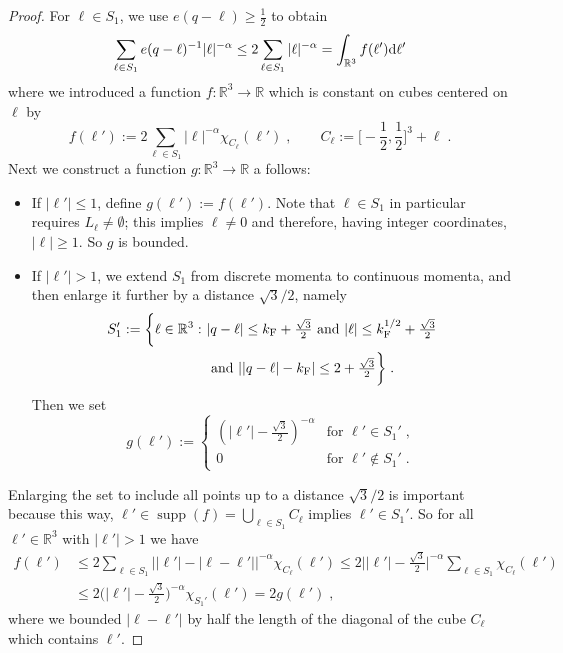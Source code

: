 \documentclass[12pt,a4paper]{article}
\numberwithin{equation}{section}
\newcommand{\1}{\mathbb{I}}
\newcommand{\di}{\textnormal{d}}
\newcommand{\F}{\mathrm{F}}
\newcommand{\kF}{k_\F}
\newcommand{\Rbb}{\mathbb{R}}
\theoremstyle{plain}
\theoremstyle{definition}
\theoremstyle{remark}
\theoremstyle{plain}
\theoremstyle{definition}
\theoremstyle{remark}
\begin{document}
\begin{proof}
For $ \ell \in S_1 $, we use $ e(q-\ell) \ge \frac{1}{2} $ to obtain
\begin{equation}
	\sum_{\ell \in S_1} e(q-\ell)^{-1} |\ell|^{-\alpha}
	\leq 2 \sum_{\ell \in S_1} |\ell|^{-\alpha}
	=  \int_{\Rbb^3} f(\ell') \di \ell'
\end{equation}
where we introduced a function $f: \Rbb^3 \to \Rbb$ which is constant on cubes centered on $\ell$ by
\[
	f(\ell') := 2 \sum_{\ell \in S_1} \lvert \ell \rvert^{-\alpha} \chi_{C_\ell}(\ell')\;, \qquad C_\ell := \Big[-\frac{1}{2},\frac{1}{2} \Big]^3 + \ell \;.
\]
Next we construct a function $g: \Rbb^3 \to \Rbb$ a follows:
\begin{itemize}
   \item If $\lvert \ell'\rvert \leq 1$, define $g(\ell') := f(\ell')$. Note that $\ell \in S_1$ in particular requires $L_\ell \not= \emptyset$; this implies $\ell \not= 0$ and therefore, having integer coordinates, $\lvert \ell \rvert \geq 1$. So $g$ is bounded.
   \item If $\lvert \ell' \rvert > 1$, we extend $S_1$ from discrete momenta to continuous momenta, and then enlarge it further by a distance $\sqrt{3}/2$, namely
\begin{equation}\label{eq:S1primeprime}
\begin{split}
   S'_1 := \bigg\{ \ell \in \Rbb^3: & \ \lvert q - \ell \rvert \leq \kF + \tfrac{\sqrt{3}}{2} \textnormal{ and } \lvert \ell \rvert \leq \kF^{1/2} + \tfrac{\sqrt{3}}{2} \\
   & \ \textnormal{ and } \lvert \lvert q-\ell \rvert -\kF\rvert \leq 2 + \tfrac{\sqrt{3}}{2} \bigg\} \;.
\end{split}
\end{equation}
Then we set
	\[
	   g(\ell') := \begin{cases}
	                  \left( \lvert \ell'\rvert - \frac{\sqrt{3}}{2} \right)^{-\alpha} & \text{for } \ell' \in S_1' \;, \\
	                  0 & \text{for } \ell' \not\in S_1' \;.
	               \end{cases}
	\]
\end{itemize}
Enlarging the set to include all points up to a distance $\sqrt{3}/2$ is important because this way, $\ell' \in \operatorname{supp}(f) = \bigcup_{\ell \in S_1} C_\ell$ implies $\ell' \in S_1'$. So for all $\ell' \in \Rbb^3$ with $\lvert \ell'\rvert > 1$ we have
\begin{equation}\label{eq:flessg}
\begin{split}
   f(\ell') & \leq 2 \sum_{\ell \in S_1} \big\lvert \lvert \ell' \rvert  -  \lvert \ell - \ell' \rvert \big\rvert^{-\alpha} \chi_{C_\ell}(\ell')
   \leq 2  \big\lvert \lvert \ell' \rvert  -  \tfrac{\sqrt{3}}{2} \big\rvert^{-\alpha} \sum_{\ell \in S_1} \chi_{C_\ell}(\ell') \\ &
   \leq 2  \Big( \lvert \ell' \rvert  -  \tfrac{\sqrt{3}}{2} \Big)^{-\alpha} \chi_{S_1'}(\ell') = 2 g(\ell') \;,
\end{split}
\end{equation}
where we bounded $\lvert \ell - \ell' \rvert$ by half the length of the diagonal of the cube $C_\ell$ which contains $\ell'$.


\end{proof}
\end{document}
